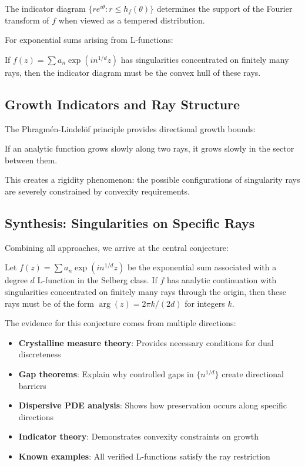 \begin{theorem}
The indicator diagram $\{re^{i\theta} : r \leq h_f(\theta)\}$ determines the support of the Fourier transform of $f$ when viewed as a tempered distribution.
\end{theorem}

For exponential sums arising from L-functions:

\begin{proposition}
If $f(z) = \sum a_n \exp(i n^{1/d} z)$ has singularities concentrated on finitely many rays, then the indicator diagram must be the convex hull of these rays.
\end{proposition}

\subsection{Growth Indicators and Ray Structure}

The Phragmén-Lindelöf principle provides directional growth bounds:

\begin{theorem}
If an analytic function grows slowly along two rays, it grows slowly in the sector between them.
\end{theorem}

This creates a rigidity phenomenon: the possible configurations of singularity rays are severely constrained by convexity requirements.

\subsection{Synthesis: Singularities on Specific Rays}

Combining all approaches, we arrive at the central conjecture:

\begin{conjecture}
Let $f(z) = \sum a_n \exp(i n^{1/d} z)$ be the exponential sum associated with a degree $d$ L-function in the Selberg class. If $f$ has analytic continuation with singularities concentrated on finitely many rays through the origin, then these rays must be of the form $\arg(z) = 2\pi k/(2d)$ for integers $k$.
\end{conjecture}

The evidence for this conjecture comes from multiple directions:

\begin{itemize}
\item \textbf{Crystalline measure theory}: Provides necessary conditions for dual discreteness
\item \textbf{Gap theorems}: Explain why controlled gaps in $\{n^{1/d}\}$ create directional barriers
\item \textbf{Dispersive PDE analysis}: Shows how preservation occurs along specific directions
\item \textbf{Indicator theory}: Demonstrates convexity constraints on growth
\item \textbf{Known examples}: All verified L-functions satisfy the ray restriction
\end{itemize}

